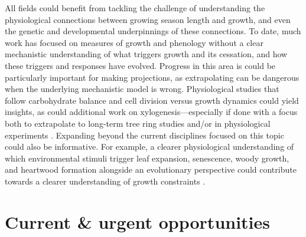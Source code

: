 \documentclass[11pt]{article}
\begin{document}
All fields could benefit from tackling the challenge of understanding the physiological connections between growing season length and growth, and even the genetic and developmental underpinnings of these connections. To date, much work has focused on measures of growth and phenology without a clear mechanistic understanding of what triggers growth and its cessation, and how these triggers and responses have evolved.  %
Progress in this area is could be particularly important for making projections, as extrapolating can be dangerous when the underlying mechanistic model is wrong. Physiological studies that follow carbohydrate balance and cell division \citep[see][]{locosselli2017dendrobiochemistry} versus growth dynamics could yield insights, as could additional work on xylogenesis---especially if done with a focus both to extrapolate to long-term tree ring studies and/or in physiological experiments \citep{fang2020physiological,simard2013intra}. Expanding beyond the current disciplines focused on this topic could also be informative. For example, a clearer physiological understanding of which environmental stimuli trigger leaf expansion, senescence, woody growth, and heartwood formation alongside an evolutionary perspective could contribute towards a clearer understanding of growth
constraints \citep{baas2011wood,eckert2019makes,ensminger2015tree,juvany2013photo}.


\section*{Current \& urgent opportunities}
\end{document}
